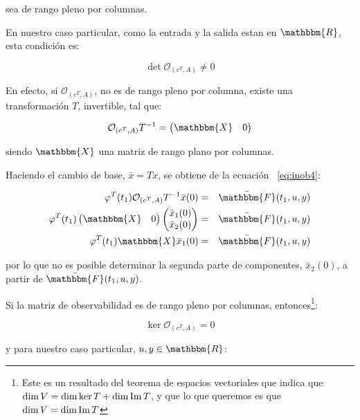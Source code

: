 	sea de rango pleno por columnas.

	En nuestro caso particular, como la entrada y la salida estan en $\mathbbm{R}$, esta condición es:

	\begin{equation*}
		\det{\mathcal{O}_{(c^T, A)}} \ne 0
	\end{equation*}

	En efecto, si $\mathcal{O}_{(c^T, A)}$, no es de rango pleno por columna, existe una transformación $T$, invertible, tal que:

	\begin{equation*}
		\mathcal{O}_{(c^T, A)} T^{-1} =
		\begin{pmatrix}
			\mathbbm{X} & 0
		\end{pmatrix}
	\end{equation*}

	siendo $\mathbbm{X}$ una matriz de rango plano por columnas.

	Haciendo el cambio de base, $\bar{x} = T x$, se obtiene de la ecuación ~\ref{eq:inob4}:

	\begin{eqnarray*}
		\varphi^T(t_1) \mathcal{O}_{(c^T, A)} T^{-1} \bar{x}(0) & = & \bar{\mathbbm{F}}(t_1, u, y) \\
		\varphi^T(t_1)
		\begin{pmatrix}
		 	\mathbbm{X} & 0
		\end{pmatrix}
		\begin{pmatrix}
		 	\bar{x}_1(0) \\
		 	\bar{x}_2(0)
		\end{pmatrix} & = & \bar{\mathbbm{F}}(t_1, u, y) \\
		\varphi^T(t_1) \mathbbm{X} \bar{x}_1(0) & = & \bar{\mathbbm{F}}(t_1, u, y)
	\end{eqnarray*}

	por lo que no es posible determinar la segunda parte de componentes, $\bar{x}_2(0)$, a partir de $\bar{\mathbbm{F}}(t_1, u, y)$.

	Si la matriz de observabilidad es de rango pleno por columnas, entonces\footnote{Este es un resultado del teorema de espacios vectoriales que indica que $\dim{V} = \dim{\ker{T}} + \dim{\operatorname{Im}{T}}$, y que lo que queremos es que $\dim{V} = \dim{\operatorname{Im}{T}}$}:

	\begin{equation*}
		\ker{\mathcal{O}_{(c^T, A)}} = {0}
	\end{equation*}

	y para nuestro caso particular, $u, y \in \mathbbm{R}$:

